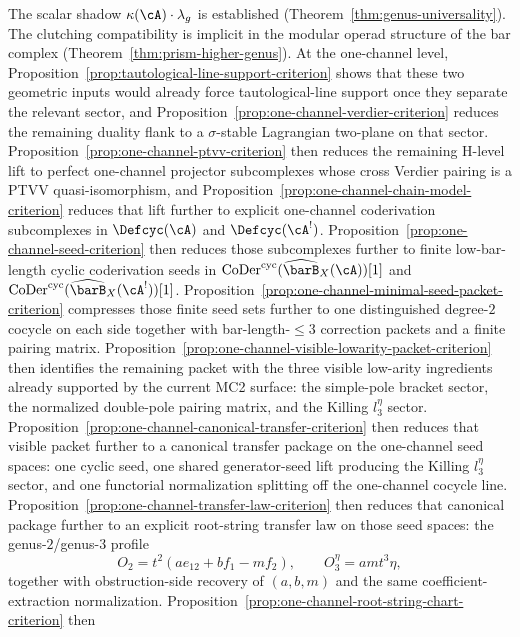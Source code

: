 \begin{remark}[Scope]\label{rem:universal-MC-scope}
The scalar shadow $\kappa(\cA) \cdot \lambda_g$ is established
(Theorem~\ref{thm:genus-universality}).  The clutching compatibility
is implicit in the modular operad structure of the bar complex
(Theorem~\ref{thm:prism-higher-genus}).  At the one-channel level,
Proposition~\ref{prop:tautological-line-support-criterion} shows that
these two geometric inputs would already force tautological-line
support once they separate the relevant sector, and
Proposition~\ref{prop:one-channel-verdier-criterion} reduces the
remaining duality flank to a $\sigma$-stable Lagrangian two-plane on
that sector.  Proposition~\ref{prop:one-channel-ptvv-criterion} then
reduces the remaining H-level lift to perfect one-channel projector
subcomplexes whose cross Verdier pairing is a PTVV quasi-isomorphism,
and Proposition~\ref{prop:one-channel-chain-model-criterion} reduces
that lift further to explicit one-channel coderivation subcomplexes in
$\Defcyc(\cA)$ and $\Defcyc(\cA^!)$.  Proposition~\ref{prop:one-channel-seed-criterion}
then reduces those subcomplexes further to finite low-bar-length
cyclic coderivation seeds in
$\operatorname{CoDer}^{\mathrm{cyc}}(\widehat{\barB}_X(\cA))[1]$ and
$\operatorname{CoDer}^{\mathrm{cyc}}(\widehat{\barB}_X(\cA^!))[1]$.
Proposition~\ref{prop:one-channel-minimal-seed-packet-criterion}
compresses those finite seed sets further to one distinguished
degree-$2$ cocycle on each side together with bar-length-$\leq 3$
correction packets and a finite pairing matrix.
Proposition~\ref{prop:one-channel-visible-lowarity-packet-criterion}
then identifies the remaining packet with the three visible low-arity
ingredients already supported by the current MC2 surface: the
simple-pole bracket sector, the normalized double-pole pairing matrix,
and the Killing $l_3^\eta$ sector.
Proposition~\ref{prop:one-channel-canonical-transfer-criterion} then
reduces that visible packet further to a canonical transfer package on
the one-channel seed spaces: one cyclic seed, one shared
generator-seed lift producing the Killing $l_3^\eta$ sector, and one
functorial normalization splitting off the one-channel cocycle line.
Proposition~\ref{prop:one-channel-transfer-law-criterion} then reduces
that canonical package further to an explicit root-string transfer law
on those seed spaces: the genus-$2$/genus-$3$ profile
\[
O_2=t^2(ae_{12}+bf_1-mf_2),
\qquad
O_3^\eta=a m t^3\eta,
\]
together with obstruction-side recovery of $(a,b,m)$ and the same
coefficient-extraction normalization.
Proposition~\ref{prop:one-channel-root-string-chart-criterion} then

\end{remark}
